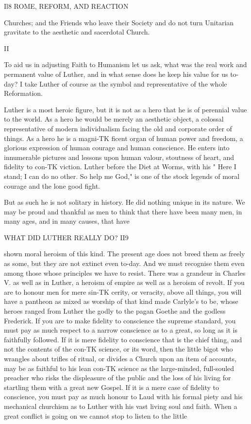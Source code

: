 \documentclass[12pt,a5paper,oneside]{book}
\begin{document}
Il8 ROME, REFORM, AND REACTION 

Churches; and the Friends who leave their Society 
and do not turn Unitarian gravitate to the aesthetic 
and sacerdotal Church. 

II 

To aid us in adjusting Faith to Humanism let us 
ask, what was the real work and permanent value of 
Luther, and in what sense does he keep his value for 
us to-day? I take Luther of course as the symbol 
and representative of the whole Reformation. 

Luther is a most heroic figure, but it is not as a 
hero that he is of perennial value to the world. As a 
hero he would be merely an aesthetic object, a colossal 
representative of modern individualism facing the old 
and corporate order of things. As a hero he is a magni-TK
ficent organ of human power and freedom, a glorious 
expression of human courage and human conscience. 
He enters into innumerable pictures and lessons upon 
human valour, stoutness of heart, and fidelity to con-TK
viction. Luther before the Diet at Worms, with his 
" Here I stand; I can do no other. So help me 
God," is one of the stock legends of moral courage 
and the lone good fight. 

But as such he is not solitary in history. He did 
nothing unique in its nature. We may be proud and 
thankful as men to think that there have been many 
men, in many ages, and in many causes, that have 



WHAT DID LUTHER REALLY DO? II9 

shown moral heroism of this kind. The present age 
does not breed them as freely as some, but they are 
not extinct even to-day. And we must recognise 
them even among those whose principles we have to 
resist. There was a grandeur in Charles V. as well 
as in Luther, a heroism of empire as well as a heroism 
of revolt. If you are to honour men for mere sin-TK
cerity, or veracity, above all things, you will have a 
pantheon as mixed as worship of that kind made 
Carlyle's to be, whose heroes ranged from Luther the 
godly to the pagan Goethe and the godless Frederick. 
If you are to make fidelity to conscience the supreme 
standard, you must pay as much respect to a narrow 
conscience as to a great, so long as it is faithfully 
followed. If it is mere fidelity to conscience that is 
the chief thing, and not the contents of the con-TK
science, or its word, then the little bigot who wrangles 
about trifles of ritual, or divides a Church upon an 
item of accounts, may be as faithful to his lean con-TK
science as the large-minded, full-souled preacher who 
risks the displeasure of the public and the loss of his 
living for startling them with a great new Gospel. 
If it is a mere case of fidelity to conscience, you must 
pay as much honour to Laud with his formal piety 
and his mechanical churchism as to Luther with his 
vast living soul and faith. When a great conflict 
is going on we cannot stop to listen to the little 
\end{document}
